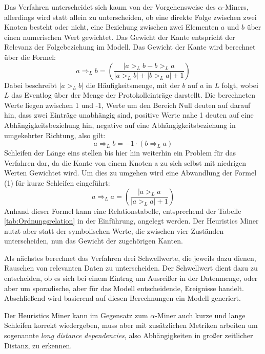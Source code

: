 Das Verfahren unterscheidet sich kaum von der Vorgehensweise des $\alpha$-Miners, allerdings wird statt allein zu unterscheiden, ob eine direkte Folge zwischen zwei Knoten besteht oder nicht, eine Beziehung zwischen zwei Elementen $a$ und $b$ über einen numerischen Wert gewichtet. Das Gewicht der Kante entspricht der Relevanz der Folgebeziehung im Modell. Das Gewicht der Kante wird berechnet über die Formel: 
\begin{equation}
 {a} \Rightarrow _L {b} = \left(\frac{ | {a} >_L {b} - {b} >_L {a} }{|{a} >_L {b}| + |{b} >_L {a}| + 1 }\right)
 \end{equation}
 Dabei beschreibt $|{a} >_L {b}|$ die Häufigkeitsmenge, mit der $b$ auf $a$ in $L$ folgt, wobei $L$ das Eventlog über der Menge der Protokolleinträge darstellt. Die berechneten Werte liegen zwischen 1 und -1, Werte um den Bereich Null deuten auf darauf hin, dass zwei Einträge unabhängig sind, positive Werte nahe 1 deuten auf eine Abhängigkeitsbeziehung hin, negative auf eine Abhängigkeitsbeziehung in umgekehrter Richtung, also gilt:
 \begin{equation}
 {a} \Rightarrow _L {b} =  -1 \cdot ( {b} \Rightarrow _L{a} )
 \end{equation}
Schleifen der Länge eins stellen bis hier hin weiterhin ein Problem für das Verfahren dar, da die Kante von einem Knoten a zu sich selbst mit niedrigen Werten Gewichtet wird. Um dies zu umgehen wird eine Abwandlung der Formel (1) für kurze Schleifen eingeführt:
 \begin{equation}
 {a} \Rightarrow _L {a} = \left(\frac{ | {a} >_L {a}}{
|{a} >_L {a}| + 1 }\right)
 \end{equation}
Anhand dieser Formel kann eine Relationstabelle, entsprechend der Tabelle \ref{tab:Ordnungsrelation} in der Einführung, angelegt werden. Der Heuristics Miner nutzt aber statt der symbolischen Werte, die zwischen vier Zuständen unterscheiden, nun das Gewicht der zugehörigen Kanten. 

Als nächstes berechnet das Verfahren drei Schwellwerte, die jeweils dazu dienen, Rauschen von relevanten Daten zu unterscheiden. Der Schwellwert dient dazu zu entscheiden, ob es sich bei einem Eintrag um Ausreißer in der Datenmenge, oder aber um sporadische, aber für das Modell entscheidende, Ereignisse handelt. Abschließend wird basierend auf diesen Berechnungen ein Modell generiert.

Der Heuristics Miner kann im Gegensatz zum $\alpha$-Miner auch kurze und lange Schleifen korrekt wiedergeben, muss aber mit zusätzlichen Metriken arbeiten um sogenannte\textit{ long distance dependencies}, also Abhängigkeiten in großer zeitlicher Distanz, zu erkennen.


